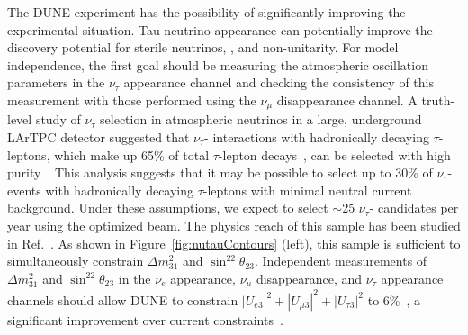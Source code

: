 
The DUNE experiment has the possibility of significantly improving the experimental situation. Tau-neutrino appearance can potentially improve the discovery potential for sterile neutrinos,  , and non-unitarity.  For model independence, the first goal should be measuring the atmospheric oscillation parameters in the $\nu_{\tau}$ appearance channel and checking the consistency of this measurement with those performed using the $\nu_{\mu}$ disappearance channel.  A truth-level study of $\nu_{\tau}$ selection in atmospheric neutrinos in a large, underground LArTPC detector suggested that $\nu_{\tau}$- interactions with hadronically decaying $\tau$-leptons, which make up 65\% of total $\tau$-lepton decays~\cite{Tanabashi:2018oca}, can be selected with high purity~\cite{Conrad:1008}.  This analysis suggests that it may be possible to select up to 30\% of $\nu_{\tau}$- events with hadronically decaying $\tau$-leptons with minimal neutral current background.  Under these assumptions, we expect to select $\sim$25 $\nu_{\tau}$- candidates per year using the  optimized beam.  The physics reach of this sample has been studied in Ref.~\cite{deGouvea:2019ozk}.  As shown in Figure~\ref{fig:nutauContours} (left), this sample is sufficient to simultaneously constrain $\Delta m^2_{31}$ and $\sin^22\theta_{23}$.  Independent measurements of $\Delta m^2_{31}$ and $\sin^22\theta_{23}$ in the $\nu_{e}$ appearance, $\nu_{\mu}$ disappearance, and $\nu_{\tau}$ appearance channels should allow DUNE to constrain $|U_{e3}|^2+|U_{\mu 3}|^2+|U_{\tau 3}|^2$ to 6\%~\cite{deGouvea:2019ozk}, a significant improvement over current constraints~\cite{Parke:2015goa}.

